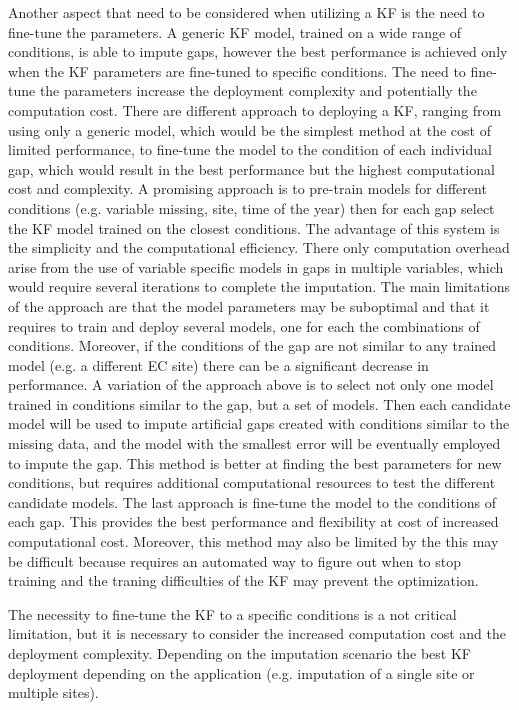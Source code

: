 \documentclass{article}
\begin{document}
Another aspect that need to be considered when utilizing a KF is the need to fine-tune the parameters. A generic KF model, trained on a wide range of conditions, is able to impute gaps, however the best performance is achieved only when the KF parameters are fine-tuned to specific conditions. The need to fine-tune the parameters increase the deployment complexity and potentially the computation cost. There are different approach to deploying a KF, ranging from using only a generic model, which would be the simplest method at the cost of limited performance, to fine-tune the model to the condition of each individual gap, which would result in the best performance but the highest computational cost and complexity. 
A promising approach is to pre-train models for different conditions (e.g. variable missing, site, time of the year) then for each gap select the KF model trained on the closest conditions. The advantage of this system is the simplicity and the computational efficiency. There  only computation overhead arise from the use of variable specific models in gaps in multiple variables, which would require several iterations to complete the imputation. The main limitations of the approach are that the model parameters may be suboptimal and that it requires to train and deploy several models, one for each the combinations of conditions. Moreover, if the conditions of the gap are not similar to any trained model (e.g. a different EC site) there can be a significant decrease in performance. 
A variation of the approach above is to select not only one model trained in conditions similar to the gap, but a set of models. Then each candidate model will be used to impute artificial gaps created with conditions similar to the missing data, and the model with the smallest error will be eventually employed to impute the gap. This method is better at finding the best parameters for new conditions, but requires additional computational resources to test the different candidate models.
The last approach is fine-tune the model to the conditions of each gap. This provides the best performance and flexibility at cost of increased computational cost. Moreover, this method may also be limited by the  this may be difficult because requires an automated way to figure out when to stop training and the traning difficulties of the KF may prevent the optimization.

The necessity to fine-tune the KF to a specific conditions is a not critical limitation, but it is necessary to consider the increased computation cost and the deployment complexity. Depending on the imputation scenario the best KF deployment depending on the application (e.g. imputation of a single site or multiple sites).
\end{document}
